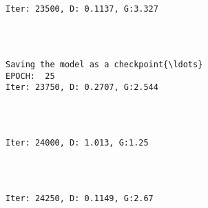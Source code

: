 \documentclass[11pt]{article}
\begin{document}
    \begin{center}
    \end{center}
    { \hspace*{\fill} \\}
    
    \begin{Verbatim}[commandchars=\\\{\}]

Iter: 23500, D: 0.1137, G:3.327
    \end{Verbatim}

    \begin{center}
    \end{center}
    { \hspace*{\fill} \\}
    
    \begin{Verbatim}[commandchars=\\\{\}]

Saving the model as a checkpoint{\ldots}
EPOCH:  25
Iter: 23750, D: 0.2707, G:2.544
    \end{Verbatim}

    \begin{center}
    \end{center}
    { \hspace*{\fill} \\}
    
    \begin{Verbatim}[commandchars=\\\{\}]

Iter: 24000, D: 1.013, G:1.25
    \end{Verbatim}

    \begin{center}
    \end{center}
    { \hspace*{\fill} \\}
    
    \begin{Verbatim}[commandchars=\\\{\}]

Iter: 24250, D: 0.1149, G:2.67
    \end{Verbatim}
\end{document}
